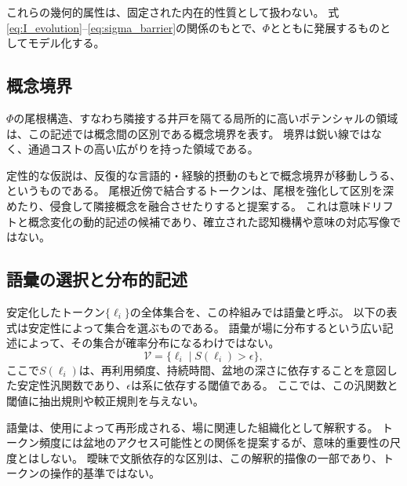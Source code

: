 これらの幾何的属性は、固定された内在的性質として扱わない。
式\eqref{eq:I_evolution}--\eqref{eq:sigma_barrier}の関係のもとで、$\Phi$とともに発展するものとしてモデル化する。

\subsection{概念境界}
$\Phi$の尾根構造、すなわち隣接する井戸を隔てる局所的に高いポテンシャルの領域は、この記述では概念間の区別である概念境界を表す。
境界は鋭い線ではなく、通過コストの高い広がりを持った領域である。

定性的な仮説は、反復的な言語的・経験的摂動のもとで概念境界が移動しうる、というものである。
尾根近傍で結合するトークンは、尾根を強化して区別を深めたり、侵食して隣接概念を融合させたりすると提案する。
これは意味ドリフトと概念変化の動的記述の候補であり、確立された認知機構や意味の対応写像ではない。

\subsection{語彙の選択と分布的記述}
安定化したトークン$\{\ell_i\}$の全体集合を、この枠組みでは語彙と呼ぶ。
以下の表式は安定性によって集合を選ぶものである。
語彙が場に分布するという広い記述によって、その集合が確率分布になるわけではない。
\begin{equation}
  \mathcal{V} = \bigl\{\ell_i \;\big|\; S(\ell_i) > \epsilon \bigr\},
  \label{eq:vocabulary}
\end{equation}
ここで$S(\ell_i)$は、再利用頻度、持続時間、盆地の深さに依存することを意図した安定性汎関数であり、$\epsilon$は系に依存する閾値である。
ここでは、この汎関数と閾値に抽出規則や較正規則を与えない。

語彙は、使用によって再形成される、場に関連した組織化として解釈する。
トークン頻度には盆地のアクセス可能性との関係を提案するが、意味的重要性の尺度とはしない。
曖昧で文脈依存的な区別は、この解釈的描像の一部であり、トークンの操作的基準ではない。

